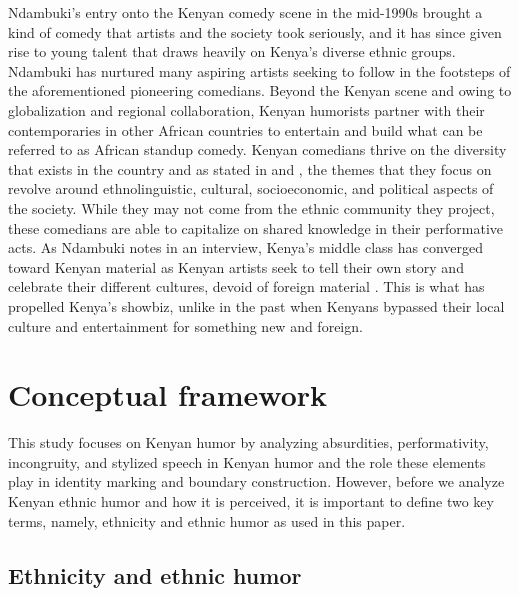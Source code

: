 \documentclass[output=paper]{langsci/langscibook}
\begin{document}
Ndambuki’s entry onto the Kenyan comedy scene in the mid-1990s brought a kind of comedy that artists and the society took seriously, and it has since given rise to young talent that draws heavily on Kenya’s diverse ethnic groups. Ndambuki has nurtured many aspiring artists seeking to follow in the footsteps of the aforementioned pioneering comedians. Beyond the Kenyan scene and owing to globalization and regional collaboration, Kenyan humorists partner with their contemporaries in other African countries to entertain and build what can be referred to as African standup comedy. Kenyan comedians thrive on the diversity that exists in the country and as stated in  and , the themes that they focus on revolve around ethnolinguistic, cultural, socioeconomic, and political aspects of the society. While they may not come from the ethnic community they project, these comedians are able to capitalize on shared knowledge in their performative acts. As Ndambuki notes in an interview, Kenya’s middle class has converged toward Kenyan material as Kenyan artists seek to tell their own story and celebrate their different cultures, devoid of foreign material \citep{Kimani2014}. This is what has propelled Kenya’s showbiz, unlike in the past when Kenyans bypassed their local culture and entertainment for something new and foreign. 

\section{Conceptual framework}

This study focuses on Kenyan humor by analyzing absurdities, performativity, incongruity, and stylized speech in Kenyan humor and the role these elements play in identity marking and boundary construction. However, before we analyze Kenyan ethnic humor and how it is perceived, it is important to define two key terms, namely, ethnicity and ethnic humor as used in this paper.

\subsection{Ethnicity and ethnic humor}
\end{document}
